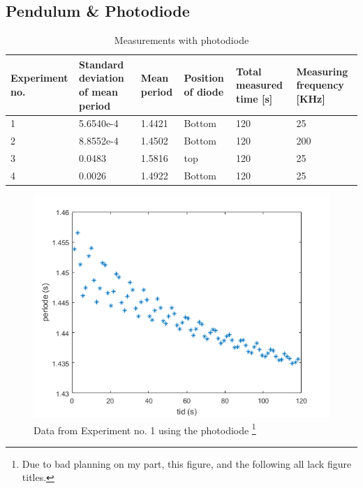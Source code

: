 \documentclass[%
 reprint,
 amsmath,amssymb,
 aps,
]{revtex4-1}
\begin{document}
    \subsection{Pendulum \& Photodiode}

    \begin{table} %
        \caption{Measurements with photodiode}
        \label{tab:photodiode}
        \begin{tabular}{| p{1.7cm} | p{1.5cm} | p{1.5cm} | p{1.5cm} | p{1.5cm} | p{1.5cm} |}
            \hline
            Experiment no. & Standard deviation of mean period & Mean period & Position of diode & Total measured time [s] & Measuring frequency [KHz] \\ \hline
            1 & 5.6540e-4 & 1.4421 & Bottom & 120 & 25 \\ \hline
            2 & 8.8552e-4 & 1.4502 & Bottom & 120 & 200 \\ \hline
            3 & 0.0483 & 1.5816 & top & 120 & 25 \\ \hline
            4 & 0.0026 & 1.4922 & Bottom & 120 & 25 \\ \hline
        \end{tabular}
    \end{table}
    
    \begin{figure}[h!]
    	\center
    	\includegraphics[scale=0.6]{forsok1fig1}
    	\caption{Data from Experiment no. 1 using the photodiode
    	\footnote{Due to bad planning on my part, this figure, and the following all lack figure titles.
    	}}
    \end{figure}
\end{document}
